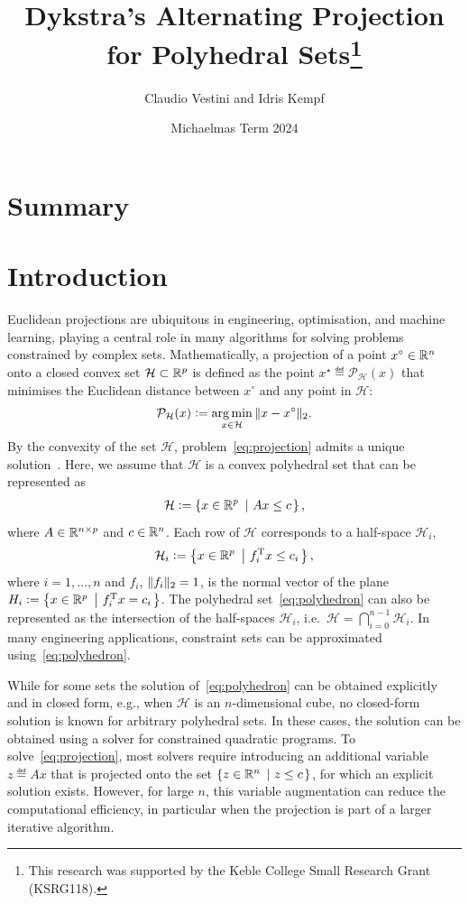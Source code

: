 \documentclass[hidelinks]{article}
\title{Dykstra's Alternating Projection for Polyhedral Sets\thanks{This research was supported by the Keble College Small Research Grant (KSRG118).}}
\author{Claudio Vestini and Idris Kempf}
\date{Michaelmas Term 2024}
\begin{document}
\maketitle

\section{Summary}



\section{Introduction}

Euclidean projections are ubiquitous in engineering, optimisation, and machine learning, playing a central role in many algorithms for solving problems constrained by complex sets. Mathematically, a projection of a point $x^\circ\in\mathbb{R}^n$ onto a closed convex set $\mathcal{H}\subset \mathbb{R}^p$ is defined as the point $x^\star\eqdef \mathcal{P}_{\mathcal{H}}(x)$ that minimises the Euclidean distance between $x^\circ$ and any point in $\mathcal{H}$:
\begin{align}\label{eq:projection}
\mathcal{P}_{\mathcal{H}}(x)\vcentcolon= \operatorname*{arg\,min}_{x\in\mathcal{H}}\Vert x-x^\circ \Vert_2.
\end{align}
By the convexity of the set $\mathcal{H}$, problem~\eqref{eq:projection} admits a unique solution~\cite[Ch.\ 3.2]{BAUSCHKEBOOK}. Here, we assume that $\mathcal{H}$ is a convex polyhedral set that can be represented as
\begin{align}\label{eq:polyhedron}
\mathcal{H}\vcentcolon=\left\{ x\in\mathbb{R}^p\ \left| \ A x \leq c \right. \right\},
\end{align}
where $A \in \mathbb{R}^{{n}\times{p}}$ and $c\in\mathbb{R}^n$. Each row of $\mathcal{H}$ corresponds to a half-space $\mathcal{H}_i$,
\begin{align}\label{eq:sets_i}
\mathcal{H}_i\vcentcolon=\left\{ x\in\mathbb{R}^p\ \left| \ f_i^{\text{T}}x \leq c_i \right. \right\},
\end{align}
where $i=1,\dots,n$ and $f_i$, $\Vert f_i \Vert_2=1$, is the normal vector of the plane $H_i\vcentcolon=\left\{ x\in\mathbb{R}^p\ \left| \ f_i^{\text{T}}x = c_i \right. \right\}$. The polyhedral set~\eqref{eq:polyhedron} can also be represented as the intersection of the half-spaces $\mathcal{H}_i$, i.e.\ $\mathcal{H}=\bigcap_{i=0}^{n-1}\mathcal{H}_i$. In many engineering applications, constraint sets can be approximated using~\eqref{eq:polyhedron}.

While for some sets the solution of~\eqref{eq:polyhedron} can be obtained explicitly and in closed form, e.g., when $\mathcal{H}$ is an $n$-dimensional cube, no closed-form solution is known for arbitrary polyhedral sets. In these cases, the solution can be obtained using a solver for constrained quadratic programs. To solve~\eqref{eq:projection}, most solvers require introducing an additional variable $z\eqdef Ax$ that is projected onto the set $\left\{ z\in\mathbb{R}^n\ \left| \ z \leq c \right. \right\}$, for which an explicit solution exists. However, for large $n$, this variable augmentation can reduce the computational efficiency, in particular when the projection is part of a larger iterative algorithm.
\end{document}
